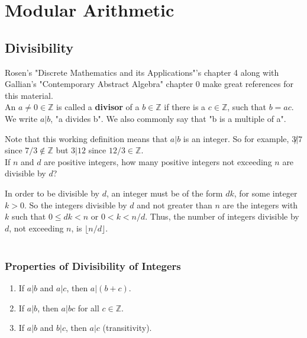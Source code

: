 \section{Modular Arithmetic}



\subsection{Divisibility}

Rosen's "Discrete Mathematics and its Applications"'s chapter 4 along with Gallian's "Contemporary
Abstract Algebra" chapter 0 make great references for this material.
\\

An $a \neq 0 \in \mathbb{Z}$ is called a \textbf{divisor}
of a $b \in \mathbb{Z}$
if there is a $c\in\mathbb{Z}$, such that $b = ac$.
We write $a|b$, "a divides b". We also commonly say that "b is a multiple of a".

Note that this working definition means that $a|b$ is an integer.
So for example, $3\not| 7$ since $7 / 3 \notin \mathbb{Z}$ but $3|12$ since $12/3 \in \mathbb{Z}$.
\\

If $n$ and $d$ are positive integers, how many positive integers not exceeding $n$ are divisible by $d$?

In order to be divisible by $d$, an integer must be of the form $dk$, for some integer $k>0$.
So the integers divisible by $d$ and not greater than $n$ are the integers with $k$ such that
$0 \leq dk < n$
or $0 < k < n/d$.
Thus, the number of integers divisible by $d$, not exceeding $n$, is $\lfloor n / d \rfloor$.
\\~\\


\subsubsection{Properties of Divisibility of Integers}

\begin{enumerate}
    \item If $a|b$ and $a|c$, then $a|(b+c)$.
    \item If $a|b$, then $a|bc$ for all $c\in\mathbb{Z}$.
    \item If $a|b$ and $b|c$, then $a|c$ (transitivity).
\end{enumerate}



